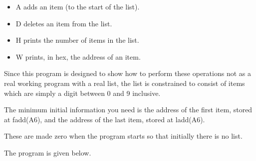 \begin{enumerate}
\begin{itemize}
\item A adds an item (to the start of the list).
\item D deletes an item from the list.
\item H prints the number of items in the list.
\item W prints, in hex, the address of an item.
\end{itemize}

Since this program is designed to show how to perform these operations not as a real working program with a real list, the list is constrained to consist of items which are simply a digit between 0 and 9 inclusive.

The minimum initial information you need is the address of the first item,
stored at fadd(A6), and the address of the last item, stored at ladd(A6).

These are made zero when the program starts so that initially there is no
list.

The program is given below.
\end{enumerate}



